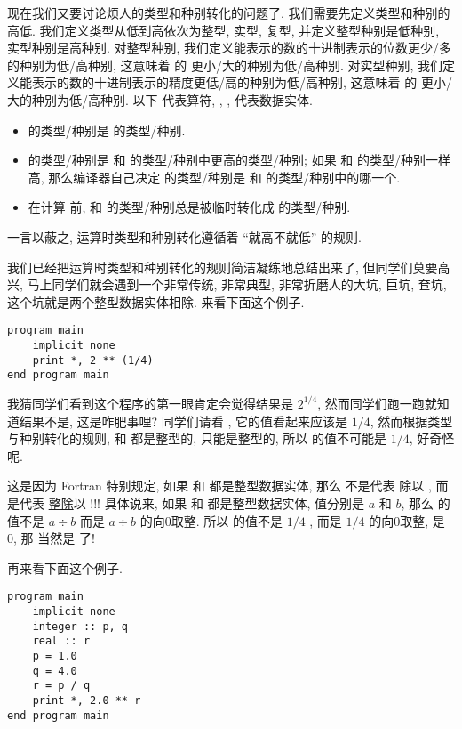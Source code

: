 现在我们又要讨论烦人的类型和种别转化的问题了. 我们需要先定义类型和种别的高低. 我们定义类型从低到高依次为整型, 实型, 复型, 并定义整型种别是低种别, 实型种别是高种别. 对整型种别, 我们定义能表示的数的十进制表示的位数更少/多的种别为低/高种别, 这意味着  的  更小/大的种别为低/高种别. 对实型种别, 我们定义能表示的数的十进制表示的精度更低/高的种别为低/高种别, 这意味着  的  更小/大的种别为低/高种别. 以下 \ttt{[op]} 代表算符, \ttt{[q]}, \ttt{[q1]}, \ttt{[q2]} 代表数据实体.
\begin{itemize}
    \item \ttt{[op][q]} 的类型/种别是 \ttt{[q]} 的类型/种别.
    \item \ttt{[q1][op][q2]} 的类型/种别是 \ttt{[q1]} 和 \ttt{[q2]} 的类型/种别中更高的类型/种别; 如果 \ttt{[q1]} 和 \ttt{[q2]} 的类型/种别一样高, 那么编译器自己决定\ttt{[q1][op][q2]} 的类型/种别是 \ttt{[q1]} 和 \ttt{[q2]} 的类型/种别中的哪一个.
    \item 在计算 \ttt{[q1][op][q2]} 前, \ttt{[q1]} 和 \ttt{[q2]} 的类型/种别总是被临时转化成 \ttt{[q1][op][q2]} 的类型/种别.
\end{itemize}
一言以蔽之, 运算时类型和种别转化遵循着 ``就高不就低'' 的规则.

我们已经把运算时类型和种别转化的规则简洁凝练地总结出来了, 但同学们莫要高兴, 马上同学们就会遇到一个非常传统, 非常典型, 非常折磨人的大坑, 巨坑, 奆坑, 这个坑就是两个整型数据实体相除. 来看下面这个例子.
\begin{lstlisting}
program main
    implicit none
    print *, 2 ** (1/4)
end program main
\end{lstlisting}

我猜同学们看到这个程序的第一眼肯定会觉得结果是 $2^{1/4}$, 然而同学们跑一跑就知道结果不是, 这是咋肥事哩? 同学们请看 , 它的值看起来应该是 $1/4$, 然而根据类型与种别转化的规则,  和  都是整型的,  只能是整型的, 所以  的值不可能是 $1/4$, 好奇怪呢.

这是因为 Fortran 特别规定, 如果 \ttt{[a]} 和 \ttt{[b]} 都是整型数据实体, 那么 \ttt{[a]/[b]} 不是代表 \ttt{[a]} 除以 \ttt{[b]}, 而是代表 \ttt{[a]} \uline{整除}以 \ttt{[b]}!!! 具体说来, 如果 \ttt{[a]} 和 \ttt{[b]} 都是整型数据实体, 值分别是 $a$ 和 $b$, 那么 \ttt{[a]/[b]} 的值不是 $a\div b$ 而是 $a\div b$ 的向0取整. 所以  的值不是 $1/4$ , 而是 $1/4$ 的向0取整, 是 $0$, 那  当然是  了!

再来看下面这个例子.
\begin{lstlisting}
program main
    implicit none
    integer :: p, q
    real :: r
    p = 1.0
    q = 4.0
    r = p / q
    print *, 2.0 ** r
end program main
\end{lstlisting}

